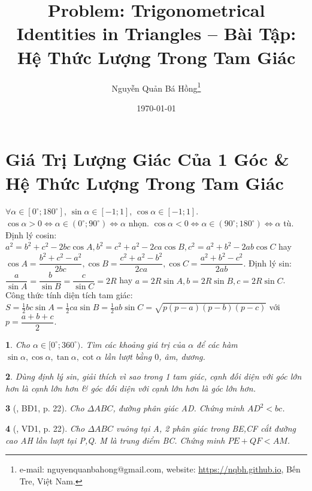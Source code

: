 \documentclass{article}
\title{Problem: Trigonometrical Identities in Triangles -- Bài Tập: Hệ Thức Lượng Trong Tam Giác}
\author{Nguyễn Quản Bá Hồng\footnote{e-mail: {\sf nguyenquanbahong@gmail.com}, website: \url{https://nqbh.github.io}, Bến Tre, Việt Nam.}}
\date{\today}
\newtheorem{baitoan}{}
\begin{document}
\maketitle
\tableofcontents


\section{Giá Trị Lượng Giác Của 1 Góc \& Hệ Thức Lượng Trong Tam Giác}
 $\forall\alpha\in[0^\circ;180^\circ]$, $\sin\alpha\in[-1;1]$, $\cos\alpha\in[-1;1]$.  $\cos\alpha > 0\Leftrightarrow\alpha\in(0^\circ;90^\circ)\Leftrightarrow\alpha$ nhọn. $\cos\alpha < 0\Leftrightarrow\alpha\in(90^\circ;180^\circ)\Leftrightarrow\alpha$ tù.  Định lý cosin: $a^2 = b^2 + c^2 - 2bc\cos A,b^2 = c^2 + a^2 - 2ca\cos B,c^2 = a^2 + b^2 - 2ab\cos C$ hay $\cos A = \dfrac{b^2 + c^2 - a^2}{2bc},\cos B = \dfrac{c^2 + a^2 - b^2}{2ca},\cos C = \dfrac{a^2 + b^2 - c^2}{2ab}$.  Định lý sin: $\dfrac{a}{\sin A} = \dfrac{b}{\sin B} = \dfrac{c}{\sin C} = 2R$ hay $a = 2R\sin A,b = 2R\sin B,c = 2R\sin C$.  Công thức tính diện tích tam giác: $S = \frac{1}{2}bc\sin A = \frac{1}{2}ca\sin B = \frac{1}{2}ab\sin C = \sqrt{p(p - a)(p - b)(p - c)}$ với $p = \dfrac{a + b + c}{2}$.

\begin{baitoan}
	Cho $\alpha\in[0^\circ;360^\circ)$. Tìm các khoảng giá trị của $\alpha$ để các hàm $\sin\alpha,\cos\alpha,\tan\alpha,\cot\alpha$ lần lượt bằng $0$, âm, dương.
\end{baitoan}

\begin{baitoan}
	Dùng định lý sin, giải thích vì sao trong 1 tam giác, cạnh đối diện với góc lớn hơn là cạnh lớn hơn \& góc đối diện với cạnh lớn hơn là góc lớn hơn.
\end{baitoan}

\begin{baitoan}[\cite{Hai_Hung_Thu_Tung2022_tap_1}, BĐ1, p. 22]
	Cho $\Delta ABC$, đường phân giác AD. Chứng minh $AD^2 < bc$.
\end{baitoan}

\begin{baitoan}[\cite{Hai_Hung_Thu_Tung2022_tap_1}, VD1, p. 22]
	Cho $\Delta ABC$ vuông tại A, 2 phân giác trong BE,CF cắt đường cao AH lần lượt tại P,Q. M là trung điểm BC. Chứng minh $PE + QF < AM$.
\end{baitoan}
\end{document}

